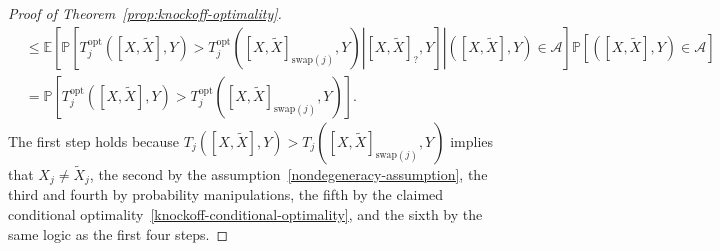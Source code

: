 \documentclass[ejs]{imsart}
\numberwithin{equation}{section}
\theoremstyle{plain}
\theoremstyle{definition}
\theoremstyle{remark}
\newcommand{\srx}{X}
\newcommand{\srxk}{\widetilde X}
\newcommand{\sry}{Y}
\begin{document}
\begin{proof}[Proof of Theorem~\ref{prop:knockoff-optimality}]
\begin{equation*}
\begin{split}
	&\leq \mathbb E\left[\left.\mathbb P\left[\left.T^{\text{opt}}_j([\srx, \srxk], \sry) > T^{\text{opt}}_j([\srx, \srxk]_{\text{swap}(j)}, \sry)\right| [\srx, \srxk]_?, \sry\right]\right|([\srx, \srxk], \sry) \in \mathcal A\right]\mathbb P[([\srx, \srxk], \sry) \in \mathcal A] \\
	&=\mathbb P\left[T^{\text{opt}}_j([\srx, \srxk], \sry) > T^{\text{opt}}_j([\srx, \srxk]_{\text{swap}(j)}, \sry)\right].
	\end{split}
	\end{equation*}
	The first step holds because $T_j([\srx, \srxk], \sry) > T_j([\srx, \srxk]_{\text{swap}(j)}, \sry)$ implies that $\srx_j \neq \srxk_j$, the second by the assumption~\eqref{nondegeneracy-assumption}, the third and fourth by probability manipulations, the fifth by the claimed conditional optimality~\eqref{knockoff-conditional-optimality}, and the sixth by the same logic as the first four steps.
	

\end{proof}
\end{document}
